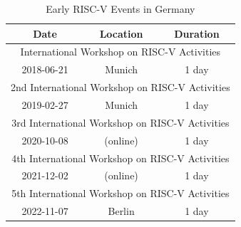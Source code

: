 \begin{table}[h]
  \small
  \centering
  \caption{Early RISC-V Events in Germany}
  \label{table-de}
  \begin{tabular}{ccc}
    \toprule\toprule
    \bf Date & \bf Location & \bf Duration \\
    \midrule\midrule
    \multicolumn{3}{c}{International Workshop on RISC-V Activities} \cite{WS-DE} \\
    \midrule
    2018-06-21 & Munich & 1 day \\
    \midrule\midrule
    \multicolumn{3}{c}{2nd International Workshop on RISC-V Activities} \cite{WS-DE} \\
    \midrule
    2019-02-27 & Munich & 1 day \\
    \midrule\midrule
    \multicolumn{3}{c}{3rd International Workshop on RISC-V Activities} \cite{WS-DE} \\
    \midrule
    2020-10-08 & (online) & 1 day \\
    \midrule\midrule
    \midrule
    \multicolumn{3}{c}{4th International Workshop on RISC-V Activities} \cite{WS-DE} \\
    2021-12-02 & (online) & 1 day \\
    \midrule\midrule
    \multicolumn{3}{c}{5th International Workshop on RISC-V Activities} \cite{WS-DE} \\
    \midrule
    2022-11-07 & Berlin & 1 day \\
    \bottomrule\bottomrule
  \end{tabular}
\end{table}
